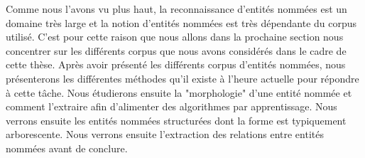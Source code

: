 \documentclass[PhD-Yoann-Dupont.tex]{subfiles}
\begin{document}
Comme nous l'avons vu plus haut, la reconnaissance d'entités nommées est un domaine très large et la notion d'entités nommées est très dépendante du corpus utilisé. C'est pour cette raison que nous allons dans la prochaine section nous concentrer sur les différents corpus que nous avons considérés dans le cadre de cette thèse. Après avoir présenté les différents corpus d'entités nommées, nous présenterons les différentes méthodes qu'il existe à l'heure actuelle pour répondre à cette tâche. Nous étudierons ensuite la "morphologie" d'une entité nommée et comment l'extraire afin d'alimenter des algorithmes par apprentissage. Nous verrons ensuite les entités nommées structurées dont la forme est typiquement arborescente. Nous verrons ensuite l'extraction des relations entre entités nommées avant de conclure.
\end{document}
